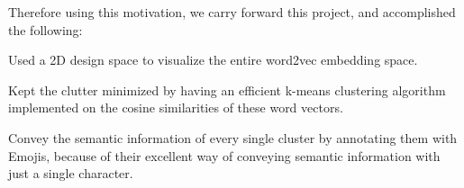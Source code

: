 Therefore using this motivation, we carry forward this project, and accomplished the following:
\begin{itemize*}
 \item Used a 2D design space to visualize the entire word2vec embedding space.
 \item Kept the clutter minimized by having an efficient k-means clustering algorithm implemented on the cosine similarities of these word vectors.
 \item Convey the semantic information of every single cluster by annotating them with Emojis, because of their excellent way of conveying semantic information with just a single character.
\end{itemize*}


